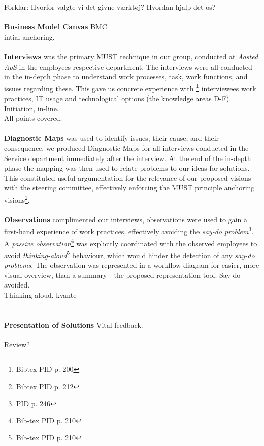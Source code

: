 Forklar: Hvorfor valgte vi det givne værktøj? Hvordan hjalp det os?\\\\
\textbf{Business Model Canvas}
BMC\\
intial anchoring.
\\\\
\textbf{Interviews} was the primary MUST technique in our group, conducted at \textit{Aasted ApS} in the employees respective department. The interviews were all conducted in the in-depth phase to understand work processes, task, work functions, and issues regarding these. This gave us concrete experience with \footnote{Bibtex PID p. 200} interviewees work practices, IT usage and technological options (the knowledge areas D-F).
Initiation, in-line.\\
All points covered.
\\\\
\textbf{Diagnostic Maps}
was used to identify issues, their cause, and their consequence, we produced Diagnostic Maps for all interviews conducted in the Service department immediately after the interview. At the end of the in-depth phase the mapping was then used to relate problems to our ideas for solutions. This constituted useful argumentation for the relevance of our proposed visions with the steering committee, effectively enforcing the  MUST principle anchoring visions\footnote{Bibtex PID p. 212}.
\\\\
\textbf{Observations}  complimented our interviews, observations were used to gain a first-hand experience of work practices, effectively avoiding the \textit{say-do problem}\footnote{PID p. 246}. A \textit{passive observation}\footnote{Bib-tex PID p. 210} was explicitly coordinated with the observed employees to avoid \textit{thinking-aloud}\footnote{Bib-tex PID p. 210} behaviour, which would hinder the detection of any \textit{say-do problems}. The observation was represented in a workflow diagram for easier, more visual overview, than a summary - the proposed representation tool.
Say-do avoided.\\
Thinking aloud, kvante\\
\\\\
\textbf{Presentation of Solutions}
Vital feedback.
\\\\
Review?